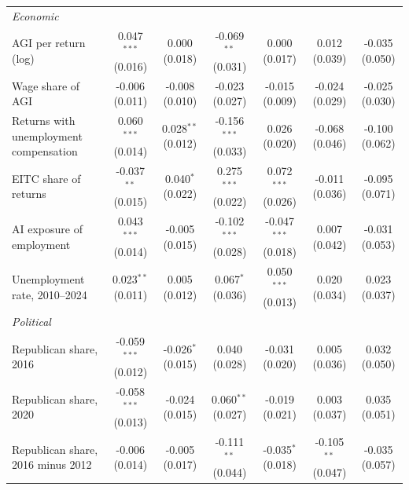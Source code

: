 \begin{tabular}{lcccccc}
\multicolumn{7}{l}{\quad \textit{Economic}} \\
\quad AGI per return (log) & 0.047$^{***}$ (0.016) & 0.000 (0.018) & -0.069$^{**}$ (0.031) & 0.000 (0.017) & 0.012 (0.039) & -0.035 (0.050) \\
\quad Wage share of AGI & -0.006 (0.011) & -0.008 (0.010) & -0.023 (0.027) & -0.015 (0.009) & -0.024 (0.029) & -0.025 (0.030) \\
\quad Returns with unemployment compensation & 0.060$^{***}$ (0.014) & 0.028$^{**}$ (0.012) & -0.156$^{***}$ (0.033) & 0.026 (0.020) & -0.068 (0.046) & -0.100 (0.062) \\
\quad EITC share of returns & -0.037$^{**}$ (0.015) & 0.040$^{*}$ (0.022) & 0.275$^{***}$ (0.022) & 0.072$^{***}$ (0.026) & -0.011 (0.036) & -0.095 (0.071) \\
\quad AI exposure of employment & 0.043$^{***}$ (0.014) & -0.005 (0.015) & -0.102$^{***}$ (0.028) & -0.047$^{***}$ (0.018) & 0.007 (0.042) & -0.031 (0.053) \\
\quad Unemployment rate, 2010--2024 & 0.023$^{**}$ (0.011) & 0.005 (0.012) & 0.067$^{*}$ (0.036) & 0.050$^{***}$ (0.013) & 0.020 (0.034) & 0.023 (0.037) \\
\multicolumn{7}{l}{\quad \textit{Political}} \\
\quad Republican share, 2016 & -0.059$^{***}$ (0.012) & -0.026$^{*}$ (0.015) & 0.040 (0.028) & -0.031 (0.020) & 0.005 (0.036) & 0.032 (0.050) \\
\quad Republican share, 2020 & -0.058$^{***}$ (0.013) & -0.024 (0.015) & 0.060$^{**}$ (0.027) & -0.019 (0.021) & 0.003 (0.037) & 0.035 (0.051) \\
\quad Republican share, 2016 minus 2012 & -0.006 (0.014) & -0.005 (0.017) & -0.111$^{**}$ (0.044) & -0.035$^{*}$ (0.018) & -0.105$^{**}$ (0.047) & -0.035 (0.057) \\
\bottomrule
\end{tabular}
